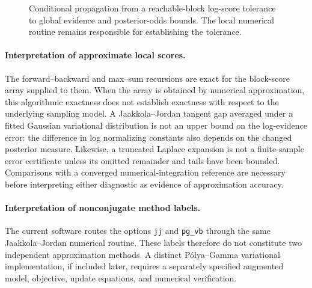 \begin{figure}[H]
\centering
\resizebox{0.96\textwidth}{!}{}
\caption{Conditional propagation from a reachable-block log-score tolerance to global evidence and posterior-odds bounds. The local numerical routine remains responsible for establishing the tolerance.}
\label{fig:local-global-stability}
\end{figure}

\paragraph{Interpretation of approximate local scores.}
The forward--backward and max--sum recursions are exact for the block-score array supplied to them. When the array is obtained by numerical approximation, this algorithmic exactness does not establish exactness with respect to the underlying sampling model. A Jaakkola--Jordan tangent gap averaged under a fitted Gaussian variational distribution is not an upper bound on the log-evidence error: the difference in log normalizing constants also depends on the changed posterior measure. Likewise, a truncated Laplace expansion is not a finite-sample error certificate unless its omitted remainder and tails have been bounded. Comparisons with a converged numerical-integration reference are necessary before interpreting either diagnostic as evidence of approximation accuracy.
\paragraph{Interpretation of nonconjugate method labels.}
The current software routes the options \texttt{jj} and \texttt{pg\_vb} through the same Jaakkola--Jordan numerical routine. These labels therefore do not constitute two independent approximation methods. A distinct P\'olya--Gamma variational implementation, if included later, requires a separately specified augmented model, objective, update equations, and numerical verification.
